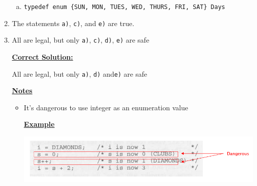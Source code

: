 \documentclass[12pt]{article}
\begin{document}
\begin{enumerate}[1.]
\begin{enumerate}[a)]
        \item

        \texttt{typedef enum \{SUN, MON, TUES, WED, THURS, FRI, SAT\} Days}


    \end{enumerate}

    \item

    The statements \texttt{a)}, \texttt{c)}, and \texttt{e)} are true.

    \item

    All are legal, but only \texttt{a)}, \texttt{c)}, \texttt{d)}, \texttt{e)} are safe

    \bigskip

    \begin{mdframed}

    \underline{\textbf{Correct Solution:}}

    \bigskip

    All are legal, but only \texttt{a)}, \texttt{d)} \color{red}and\color{black}\:\texttt{e)} are safe

    \end{mdframed}

    \bigskip

    \underline{\textbf{Notes}}

    \begin{itemize}
        \item It's dangerous to use integer as an enumeration value

        \bigskip

        \underline{\textbf{Example}}

        \begin{center}
        \includegraphics[width=\linewidth]{images/review_7_solution_14.png}
        \end{center}
    \end{itemize}
\end{enumerate}
\end{document}
